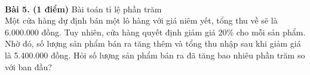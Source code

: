\documentclass[12pt]{article}
\begin{document}
\begin{center}
\begin{minipage}{0.9\textwidth}
        \\
        \textbf{Bài 5. (1 điểm)} Bài toán tỉ lệ phần trăm \\
        Một cửa hàng dự định bán một lô hàng với giá niêm yết, tổng thu về sẽ là 6.000.000 đồng. Tuy nhiên, cửa hàng quyết định giảm giá 20\% cho mỗi sản phẩm. Nhờ đó, số lượng sản phẩm bán ra tăng thêm và tổng thu nhập sau khi giảm giá là 5.400.000 đồng. Hỏi số lượng sản phẩm bán ra đã tăng bao nhiêu phần trăm so với ban đầu?
    \end{minipage}
\end{center}
\end{document}
